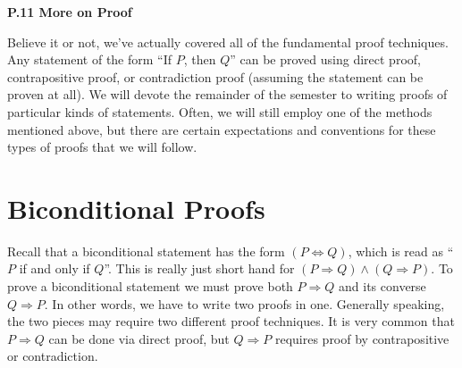 \documentclass[12 pt]{article}
\newcommand{\Ra}{\Rightarrow}
\theoremstyle{definition}
\theoremstyle{plain}
\theoremstyle{mytheorem}
\theoremstyle{myexample}
\theoremstyle{mydefinition}
\begin{document}
\begin{center}
\textbf{P.11 More on Proof}
\end{center}

Believe it or not, we've actually covered all of the fundamental proof techniques.  Any statement of the form ``If $P$, then $Q$'' can be proved using direct proof, contrapositive proof, or contradiction proof (assuming the statement can be proven at all).  We will devote the remainder of the semester to writing proofs of particular kinds of statements.  Often, we will still employ one of the methods mentioned above, but there are certain expectations and conventions for these types of proofs that we will follow.
\begin{center}
\end{center}
\section{Biconditional Proofs}
\noindent Recall that a biconditional statement has the form $(P \Leftrightarrow Q)$, which is read as ``$P$ if and only if $Q$''.  This is really just short hand for $(P \Rightarrow Q) \wedge (Q \Rightarrow P)$.  To prove a biconditional statement we must prove both $P \Rightarrow Q$ and its converse $Q \Ra P$.  In other words, we have to write two proofs in one.  Generally speaking, the two pieces may require two different proof techniques.  It is very common that $P \Ra Q$ can be done via direct proof, but $Q \Ra P$ requires proof by contrapositive or contradiction.
\end{document}
